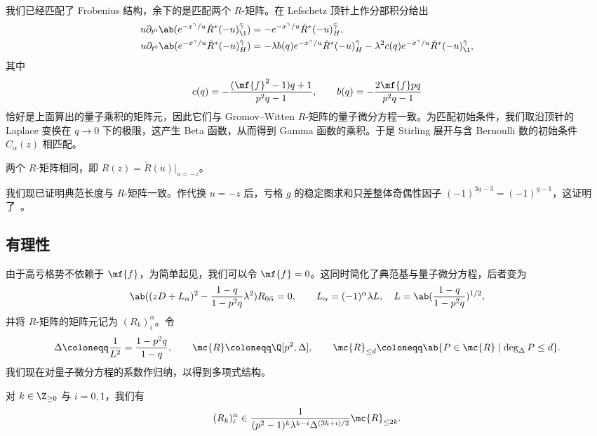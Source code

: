 我们已经匹配了 Frobenius 结构，余下的是匹配两个 \(R\)-矩阵。在 Lefschetz 顶针上作分部积分给出
\begin{align*}
    u \partial_{t^0}\ab(e^{-x^{\gamma}/u}\check{R}^*(-u)^{\bar{\gamma}}_{\1}) &= -e^{-x^{\gamma}/u}\check{R}^*(-u)^{\bar{\gamma}}_H, \\
    u\partial_{t^0}\ab(e^{-x^{\gamma}/u}\check{R}^*(-u)^{\bar{\gamma}}_H) &= -\lambda b(q)e^{-x^{\gamma}/u}\check{R}^*(-u)^{\bar{\gamma}}_H - \lambda^2 c(q) e^{-x^{\gamma}/u}\check{R}^*(-u)^{\bar{\gamma}}_{\1},
\end{align*}
其中
\[ c(q) = -\frac{(\mf{f}^2-1)q+1}{p^2q-1}, \qquad b(q) = -\frac{2\mf{f}pq}{p^2q-1} \]
恰好是上面算出的量子乘积的矩阵元，因此它们与 Gromov--Witten \(R\)-矩阵的量子微分方程一致。为匹配初始条件，我们取沿顶针的 Laplace 变换在 \(q \to 0\) 下的极限，这产生 Beta 函数，从而得到 Gamma 函数的乘积。于是 Stirling 展开与含 Bernoulli 数的初始条件 \(C_{\alpha}(z)\) 相匹配。

\begin{prop}%
\label{prop:R matrices coincide}
    两个 \(R\)-矩阵相同，即 \(R(z) = \check{R}(u)|_{u=-z}\)。
\end{prop}

我们现已证明典范长度与 \(R\)-矩阵一致。作代换 \(u = -z\) 后，亏格 \(g\) 的稳定图求和只差整体奇偶性因子 \((-1)^{3g-3} = (-1)^{g-1}\)，这证明了~。

\subsection{有理性}%
\label{sub:Rationality}

由于高亏格势不依赖于 \(\mf{f}\)，为简单起见，我们可以令 \(\mf{f} = 0\)。这同时简化了典范基与量子微分方程，后者变为
\[ \ab((zD+L_{\alpha})^2 - \frac{1-q}{1-p^2q}\lambda^2)R_{0\bar{\alpha}} = 0, \qquad L_{\alpha} = (-1)^{\alpha}\lambda L, \quad L = \ab(\frac{1-q}{1-p^2q})^{1/2}, \]
并将 \(R\)-矩阵的矩阵元记为 \((R_k)_i^{\alpha}\)。令
\[ \Delta \coloneqq \frac{1}{L^2} = \frac{1-p^2q}{1-q}, \qquad \mc{R} \coloneqq \Q[p^2,\Delta], \qquad \mc{R}_{\leq d} \coloneqq \ab\{P \in \mc{R} \mid \deg_{\Delta} P \leq d\}. \]
我们现在对量子微分方程的系数作归纳，以得到多项式结构。

\begin{prop}%
\label{prop:R matrix polynomiality}
    对 \(k \in \Z_{\geq0}\) 与 \(i = 0,1\)，我们有
    \[ (R_k)_i^{\alpha} \in \frac{1}{(p^2-1)^k \lambda^{k-i}\Delta^{(3k+i)/2}}\mc{R}_{\leq 2k}. \]
\end{prop}


